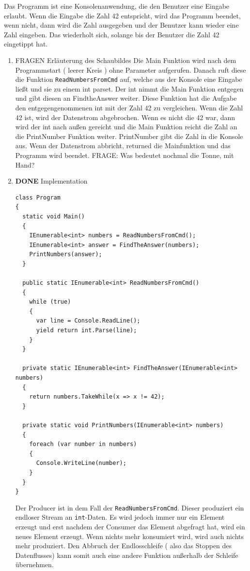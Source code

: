 \documentclass[a4paper,12pt,oneside]{book}
\begin{document}
Das Programm ist eine Konsolenanwendung, die den Benutzer eine Eingabe erlaubt.
Wenn die Eingabe die Zahl 42 entspricht, wird das Programm beendet, wenn nicht,
dann wird die Zahl ausgegeben und der Benutzer kann wieder eine Zahl eingeben.
Das wiederholt sich, solange bis der Benutzer die Zahl 42 eingetippt hat.


\begin{enumerate}
\item FRAGEN Erläuterung des Schaubildes
\label{sec-4-3-2-1}
Die Main Funktion wird nach dem Programmstart ( leerer Kreis ) ohne Parameter aufgerufen.
Danach ruft diese die Funktion \texttt{ReadNumbersFromCmd} auf, welche aus der Konsole eine Eingabe ließt und sie
zu einem int parset. Der int nimmt die Main Funktion entgegen und gibt diesen an FindtheAnswer weiter.
Diese Funktion hat die Aufgabe den entgegengenommenen int mit der Zahl 42 zu vergleichen. Wenn die Zahl 42 ist, wird der Datenstrom
abgebrochen. Wenn es nicht die 42 war, dann wird der int nach außen gereicht und die Main Funktion reicht die Zahl an die
PrintNumber Funktion weiter. PrintNumber gibt die Zahl in die Konsole aus.
Wenn der Datenstrom abbricht, returned die Mainfunktion und das Programm wird beendet.
FRAGE: Was bedeutet nochmal die Tonne, mit Hand?

\item {\bfseries\sffamily DONE} Implementation
\label{sec-4-3-2-2}
\begin{verbatim}
class Program
{
  static void Main()
  {
    IEnumerable<int> numbers = ReadNumbersFromCmd();
    IEnumerable<int> answer = FindTheAnswer(numbers);
    PrintNumbers(answer);
  }

  public static IEnumerable<int> ReadNumbersFromCmd()
  {
    while (true)
    {
      var line = Console.ReadLine();
      yield return int.Parse(line);
    }
  }

  private static IEnumerable<int> FindTheAnswer(IEnumerable<int> numbers)
  {
    return numbers.TakeWhile(x => x != 42);
  }

  private static void PrintNumbers(IEnumerable<int> numbers)
  {
    foreach (var number in numbers)
    {
      Console.WriteLine(number);
    }
  }
}
\end{verbatim}

Der Producer ist in dem Fall der \texttt{ReadNumbersFromCmd}.
Dieser produziert ein endloser Stream an \texttt{int}-Daten.
Es wird jedoch immer nur ein Element erzeugt und erst nachdem der Consumer das
Element abgefragt hat, wird ein neues Element erzeugt.
Wenn nichts mehr konsumiert wird, wird auch nichts mehr produziert.
Den Abbruch der Endlosschleife ( also das Stoppen des Datenflusses) kann somit auch eine andere Funktion außerhalb der Schleife
übernehmen.
\end{enumerate}
\end{document}
